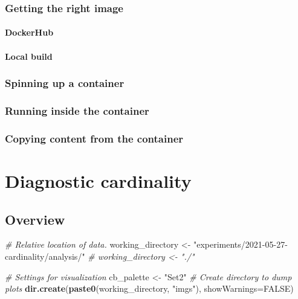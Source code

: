 \documentclass[]{book}
\newenvironment{Shaded}{\begin{snugshade}}{\end{snugshade}}
\newcommand{\CommentTok}[1]{\textcolor[rgb]{0.56,0.35,0.01}{\textit{#1}}}
\newcommand{\DataTypeTok}[1]{\textcolor[rgb]{0.13,0.29,0.53}{#1}}
\newcommand{\KeywordTok}[1]{\textcolor[rgb]{0.13,0.29,0.53}{\textbf{#1}}}
\newcommand{\NormalTok}[1]{#1}
\newcommand{\OtherTok}[1]{\textcolor[rgb]{0.56,0.35,0.01}{#1}}
\newcommand{\StringTok}[1]{\textcolor[rgb]{0.31,0.60,0.02}{#1}}
\begin{document}
\hypertarget{getting-the-right-image}{%
\subsection{Getting the right image}\label{getting-the-right-image}}

\hypertarget{dockerhub}{%
\subsubsection{DockerHub}\label{dockerhub}}

\hypertarget{local-build}{%
\subsubsection{Local build}\label{local-build}}

\hypertarget{spinning-up-a-container}{%
\subsection{Spinning up a container}\label{spinning-up-a-container}}

\hypertarget{running-inside-the-container}{%
\subsection{Running inside the container}\label{running-inside-the-container}}

\hypertarget{copying-content-from-the-container}{%
\subsection{Copying content from the container}\label{copying-content-from-the-container}}

\hypertarget{diagnostic-cardinality}{%
\chapter{Diagnostic cardinality}\label{diagnostic-cardinality}}

\hypertarget{overview}{%
\section{Overview}\label{overview}}

\begin{Shaded}
\begin{Highlighting}[]
\CommentTok{# Relative location of data.}
\NormalTok{working_directory <-}
\StringTok{  "experiments/2021-05-27-cardinality/analysis/"}
\CommentTok{# working_directory <- "./"}

\CommentTok{# Settings for visualization}
\NormalTok{cb_palette <-}\StringTok{ "Set2"}
\CommentTok{# Create directory to dump plots}
\KeywordTok{dir.create}\NormalTok{(}\KeywordTok{paste0}\NormalTok{(working_directory, }\StringTok{"imgs"}\NormalTok{), }\DataTypeTok{showWarnings=}\OtherTok{FALSE}\NormalTok{)}
\end{Highlighting}
\end{Shaded}
\end{document}
